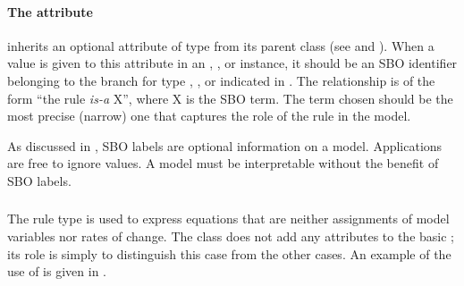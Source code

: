 
\paragraph{The  attribute}

\Rule inherits an optional 
attribute of type  from its parent
class \SBase (see 
and ).  When a value is given to this
attribute in an \AlgebraicRule, \AssignmentRule, or
\RateRule instance, it should be an
SBO identifier belonging to the branch for type  \AlgebraicRule, \AssignmentRule, or
\RateRule indicated in .  The relationship is
of the form ``the rule \emph{is-a} X'', where X is
the SBO term.  The term chosen should be the most precise (narrow)
one that captures the role of the rule in the model.

As discussed in , SBO labels are optional
information on a model.  Applications are free to ignore
 values.  A model must be interpretable without the
benefit of SBO labels.

\clearpagevertwo

\subsubsection{}
\label{sec:algebraicrule}

The rule type \AlgebraicRule is used to express equations that are
neither assignments of model variables nor rates of change.  The
\AlgebraicRule class does not add any attributes to the basic
\Rule; its role is simply to distinguish this case from the other
cases.  An example of the use of \AlgebraicRule is given in
.

